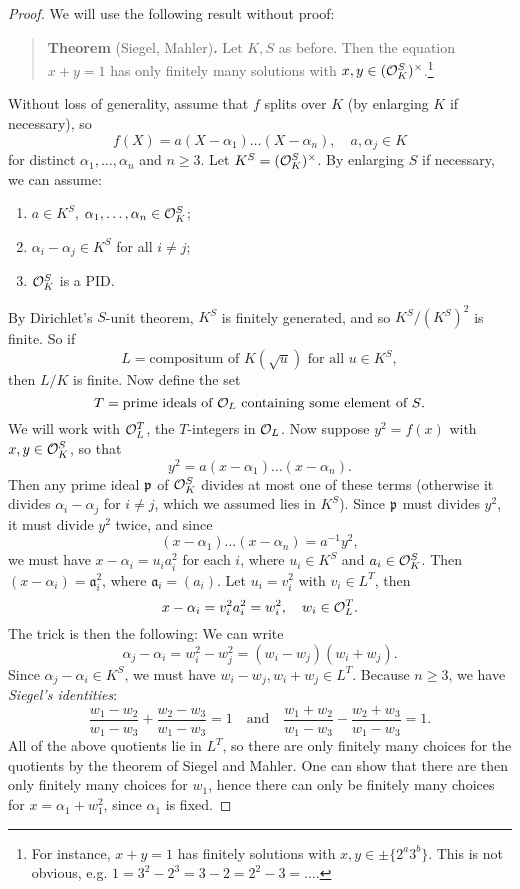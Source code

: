\begin{proof}
  We will use the following result without proof:
  \begin{quote}
    \textbf{Theorem} (Siegel, Mahler)\textbf{.}
    Let $K, S$ as before. Then the equation $x + y = 1$
    has only finitely many solutions with $x, y \in (\mathcal{O}_K^S)^\times$.\footnote{For instance, $x + y = 1$ has finitely solutions with $x, y \in \pm \{2^a 3^b\}$. This is not obvious, e.g. $1 = 3^2 - 2^3 = 3 - 2 = 2^2 - 3 = \dots$.}
  \end{quote}
  Without loss of generality, assume that $f$ splits over
  $K$ (by enlarging $K$ if necessary), so
  \[
    f(X) = a(X - \alpha_1) \dots (X - \alpha_n), \quad a, \alpha_j \in K
  \]
  for distinct $\alpha_1, \dots, \alpha_n$ and
  $n \ge 3$. Let $K^S = (\mathcal{O}_K^S)^\times$.
  By enlarging $S$ if necessary, we
  can assume:
  \begin{enumerate}
    \item $a \in K^S$, $\alpha_1, \dots, \alpha_n \in \mathcal{O}_K^S$;
    \item $\alpha_i - \alpha_j \in K^S$ for all $i \ne j$;
    \item $\mathcal{O}_K^S$ is a PID.
  \end{enumerate}
  By Dirichlet's $S$-unit theorem, $K^S$ is
  finitely generated, and so $K^S / (K^S)^2$ is finite.
  So if
  \[
    L = \text{compositum of $K(\sqrt{u})$ for all $u \in K^S$},
  \]
  then $L / K$ is finite. Now define the set
  \[
    T = \text{prime ideals of $\mathcal{O}_L$ containing some element of $S$}.
  \]
  We will work with $\mathcal{O}_L^T$, the
  $T$-integers in $\mathcal{O}_L$. Now suppose
  $y^2 = f(x)$ with $x, y \in \mathcal{O}_K^S$, so that
  \[
    y^2 = a(x - \alpha_1) \dots (x - \alpha_n).
  \]
  Then any prime ideal $\mathfrak{p}$ of $\mathcal{O}_K^S$ divides
  at most one of these terms (otherwise it divides
  $\alpha_i - \alpha_j$ for $i \ne j$, which we assumed
  lies in $K^S$). Since $\mathfrak{p}$ must divides $y^2$, it
  must divide $y^2$ twice, and since
  \[
    (x - \alpha_1) \dots (x - \alpha_n) = a^{-1} y^2,
  \]
  we must have $x - \alpha_i = u_i a_i^2$
  for each $i$, where $u_i \in K^S$ and
  $a_i \in \mathcal{O}_K^S$. Then
  $(x - \alpha_i) = \mathfrak{a}_i^2$, where $\mathfrak{a}_i = (a_i)$.
  Let $u_i = v_i^2$ with $v_i \in L^T$, then
  \[
    x - \alpha_i = v_i^2 a_i^2 = w_i^2, \quad w_i \in \mathcal{O}_L^T.
  \]
  The trick is then the following: We can write
  \[
    \alpha_j - \alpha_i = w_i^2 - w_j^2
    = (w_i - w_j)(w_i + w_j).
  \]
  Since $\alpha_j - \alpha_i \in K^S$, we must have
  $w_i - w_j, w_i + w_j \in L^T$. Because
  $n \ge 3$, we have \emph{Siegel's identities}:
  \[
    \frac{w_1 - w_2}{w_1 - w_3} + \frac{w_2 - w_3}{w_1 - w_3} = 1 \quad \text{and} \quad
    \frac{w_1 + w_2}{w_1 - w_3} - \frac{w_2 + w_3}{w_1 - w_3} = 1.
  \]
  All of the above quotients lie in $L^T$, so there
  are only finitely many choices for the quotients
  by the theorem of Siegel and Mahler.
  One can show that there are then only finitely
  many choices for $w_1$, hence there can only be
  finitely many choices for $x = \alpha_1 + w_1^2$,
  since $\alpha_1$ is fixed.
\end{proof}
